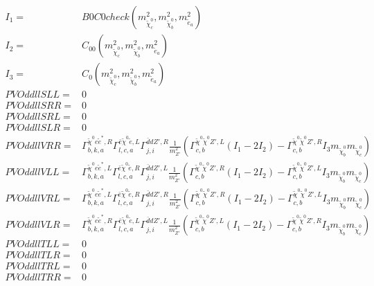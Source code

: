 \documentclass[A4,landscape]{article}
\begin{document}
\begin{align} 
I_1= & B0C0check(m^2_{\tilde{\chi}^0_{{c}}}, m^2_{\tilde{\chi}^0_{{b}}}, m^2_{\tilde{e}_{{a}}}) \\ 
I_2= & C_{00}(m^2_{\tilde{\chi}^0_{{c}}}, m^2_{\tilde{\chi}^0_{{b}}}, m^2_{\tilde{e}_{{a}}}) \\ 
I_3= & C_0(m^2_{\tilde{\chi}^0_{{c}}}, m^2_{\tilde{\chi}^0_{{b}}}, m^2_{\tilde{e}_{{a}}}) \\ 
  PVOddllSLL= & 0 \\ 
  PVOddllSRR= & 0 \\ 
  PVOddllSRL= & 0 \\ 
  PVOddllSLR= & 0 \\ 
  PVOddllVRR= &  \Gamma^{\tilde{\chi}^0 e \tilde{e}^*,R}_{b, k, a} \Gamma^{\bar{e}\tilde{\chi}^0 \tilde{e} ,L}_{l, c, a} \Gamma^{\bar{d}d {Z'} ,R}_{j, i} \frac{1}{m^2_{{Z'}}} (\Gamma^{\tilde{\chi}^0 \tilde{\chi}^0 {Z'} ,L}_{c, b} (I_1 - 2 I_2) - \Gamma^{\tilde{\chi}^0 \tilde{\chi}^0 {Z'} ,R}_{c, b} I_3 m_{\tilde{\chi}^0_{{b}}} m_{\tilde{\chi}^0_{{c}}}) \\ 
  PVOddllVLL= &  \Gamma^{\tilde{\chi}^0 e \tilde{e}^*,L}_{b, k, a} \Gamma^{\bar{e}\tilde{\chi}^0 \tilde{e} ,R}_{l, c, a} \Gamma^{\bar{d}d {Z'} ,L}_{j, i} \frac{1}{m^2_{{Z'}}} (\Gamma^{\tilde{\chi}^0 \tilde{\chi}^0 {Z'} ,R}_{c, b} (I_1 - 2 I_2) - \Gamma^{\tilde{\chi}^0 \tilde{\chi}^0 {Z'} ,L}_{c, b} I_3 m_{\tilde{\chi}^0_{{b}}} m_{\tilde{\chi}^0_{{c}}}) \\ 
  PVOddllVRL= &  \Gamma^{\tilde{\chi}^0 e \tilde{e}^*,L}_{b, k, a} \Gamma^{\bar{e}\tilde{\chi}^0 \tilde{e} ,R}_{l, c, a} \Gamma^{\bar{d}d {Z'} ,R}_{j, i} \frac{1}{m^2_{{Z'}}} (\Gamma^{\tilde{\chi}^0 \tilde{\chi}^0 {Z'} ,R}_{c, b} (I_1 - 2 I_2) - \Gamma^{\tilde{\chi}^0 \tilde{\chi}^0 {Z'} ,L}_{c, b} I_3 m_{\tilde{\chi}^0_{{b}}} m_{\tilde{\chi}^0_{{c}}}) \\ 
  PVOddllVLR= &  \Gamma^{\tilde{\chi}^0 e \tilde{e}^*,R}_{b, k, a} \Gamma^{\bar{e}\tilde{\chi}^0 \tilde{e} ,L}_{l, c, a} \Gamma^{\bar{d}d {Z'} ,L}_{j, i} \frac{1}{m^2_{{Z'}}} (\Gamma^{\tilde{\chi}^0 \tilde{\chi}^0 {Z'} ,L}_{c, b} (I_1 - 2 I_2) - \Gamma^{\tilde{\chi}^0 \tilde{\chi}^0 {Z'} ,R}_{c, b} I_3 m_{\tilde{\chi}^0_{{b}}} m_{\tilde{\chi}^0_{{c}}}) \\ 
  PVOddllTLL= & 0 \\ 
  PVOddllTLR= & 0 \\ 
  PVOddllTRL= & 0 \\ 
  PVOddllTRR= & 0 \\ 
\end{align} 
\end{document}
